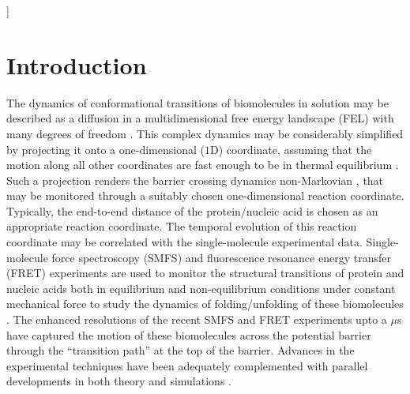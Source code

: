 \documentclass[twoside,twocolumn,9pt]{article}
\begin{document}
  ]

\renewcommand*\rmdefault{bch}\normalfont\upshape
\rmfamily
\section*{}
\vspace{-1cm}





\section{Introduction} 

The dynamics of conformational transitions of biomolecules in solution may be described as a 
diffusion in a multidimensional free energy landscape (FEL) with many degrees of freedom
\cite{kramers1940brownian,zwanzig2001nonequilibrium,makarov2021barrier}. 
This complex dynamics may be considerably simplified by projecting it onto a 
one-dimensional ($1$D) coordinate, assuming that the motion along all other coordinates
are fast enough to be in thermal equilibrium \cite{berezhkovskii2013diffusion,berezhkovskii2020nonequilibrium}. 
Such a projection renders the barrier crossing dynamics 
non-Markovian \cite{kramers1940brownian,berezhkovskii2020nonequilibrium}, 
that may be monitored through a suitably chosen one-dimensional reaction coordinate. Typically, the end-to-end 
distance of the protein/nucleic acid is chosen as an appropriate reaction coordinate.  
The temporal evolution of this reaction coordinate may be correlated with the single-molecule experimental data.
Single-molecule force spectroscopy (SMFS) and fluorescence
resonance energy transfer (FRET) experiments are used to monitor the structural transitions of protein and 
nucleic acids both in equilibrium and non-equilibrium conditions under constant mechanical force to study the dynamics
of folding/unfolding of these biomolecules 
\cite{manuel2015reconstructing,chodera2011splitting,greenleaf2008direct,neupane2011single}. 
The enhanced resolutions of the recent SMFS and FRET experiments upto a $\mu$s
\cite{chung2018protein,hoffer2019probing,neupane2016direct} 
have captured the motion of these biomolecules across the potential barrier through 
the ``transition path'' at the top of the barrier. Advances in the experimental techniques have been adequately 
complemented with parallel developments in both theory and simulations
\cite{makarov2021barrier,sharma2021effect,singh2021generalized,berezhkovskii2020nonequilibrium,kim2015mean,berezhkovskii2013diffusion}. 
\end{document}
